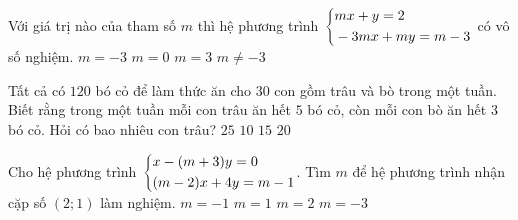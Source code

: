 \begin{bt}%
	Với giá trị nào của tham số $ m $	 thì hệ phương trình $ \left\{\begin{aligned}&mx+y=2\\&-3mx+my=m-3\end{aligned}\right. $ có vô số nghiệm.
	\choice
	{\True $ m = -3 $}
	{$ m = 0 $}
	{$ m = 3 $}
	{$ m \ne -3 $}
\end{bt}
\begin{bt}%
	Tất cả có $ 120 $ bó cỏ để làm thức ăn cho $ 30 $ con gồm trâu và bò trong một tuần. Biết rằng trong một tuần mỗi con trâu ăn hết $ 5 $ bó cỏ, còn mỗi con bò ăn hết $ 3 $ bó cỏ. Hỏi có bao nhiêu con trâu?
	\choice
	{$ 25 $}
	{$ 10 $}
	{\True $ 15 $}
	{$ 20 $}
\end{bt}
\begin{bt}%
	Cho hệ phương trình $ \left\{\begin{aligned}&x-(m+3)y=0\\&(m-2)x+4y=m-1\end{aligned}\right. $. Tìm $ m  $ để hệ phương trình nhận cặp số $ (2;1) $ làm nghiệm.
	\choice
	{\True $ m = -1 $}
	{$ m=1 $}
	{$ m = 2 $}
	{$ m = -3 $}
\end{bt}
